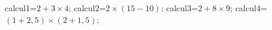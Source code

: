 \documentclass[exercice]{thedocument}%
\begin{document}
%
    \>calcul1=$2+3\times4$;%
    \>calcul2=$2\times(15-10)$;%
    \>calcul3=$2+8\times9$;%
    \>calcul4=$(1+2,5)\times(2+1,5)$;%
\end{document}
